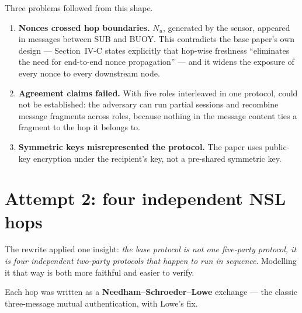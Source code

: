 Three problems followed from this shape.

\begin{enumerate}
\item \textbf{Nonces crossed hop boundaries.} $N_u$, generated by the sensor, appeared in
      messages between SUB and BUOY. This contradicts the base paper's own design ---
      Section~IV-C states explicitly that hop-wise freshness ``eliminates the need for
      end-to-end nonce propagation'' --- and it widens the exposure of every nonce to every
      downstream node.
\item \textbf{Agreement claims failed.} With five roles interleaved in one protocol,
       could not be established: the adversary can run partial sessions and
      recombine message fragments across roles, because nothing in the message content ties
      a fragment to the hop it belongs to.
\item \textbf{Symmetric keys  misrepresented the protocol.} The paper uses
      public-key encryption under the recipient's key, not a pre-shared symmetric key.
\end{enumerate}

\section{Attempt 2: four independent NSL hops}

The rewrite applied one insight: \emph{the base protocol is not one five-party protocol, it
is four independent two-party protocols that happen to run in sequence}. Modelling it that
way is both more faithful and easier to verify.

Each hop was written as a \textbf{Needham--Schroeder--Lowe} exchange --- the classic
three-message mutual authentication, with Lowe's fix.

